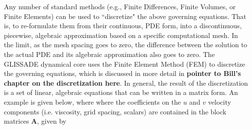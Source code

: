 %

Any number of standard methods (e.g., Finite Differences, Finite Volumes, or Finite Elements) can be used to ``discretize" the above governing equations. That is, to re-formulate them from their continuous, PDE form, into a discontinuous, piecewise, algebraic approximation based on a specific computational mesh. In the limit, as the mesh spacing goes to zero, the difference between the solution to the actual PDE and its algebraic approximation also goes to zero. The GLISSADE dynamical core uses the Finite Element Method (FEM) to discretize the governing equations, which is discussed in more detail in \textbf{pointer to Bill's chapter on the discretization here}. In general, the result of the discretization is a set of linear, algebraic equations that can be written in a matrix form. An example is given below, where where the coefficients on the $u$ and $v$ velocity components (i.e. viscosity, grid spacing, scalars) are contained in the block matrices \textbf{A}, given by 

